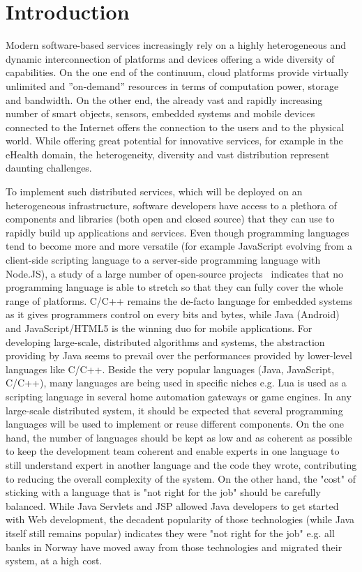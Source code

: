 \section{Introduction}

Modern software-based services increasingly rely on a highly heterogeneous and dynamic interconnection of platforms and devices offering a wide diversity of capabilities. On the one end of the continuum, cloud platforms provide virtually unlimited and ”on-demand” resources in terms of computation power, storage and bandwidth. On the other end, the already vast and rapidly increasing number of smart objects, sensors, embedded systems and mobile devices connected to the Internet offers the connection to the users and to the physical world. While offering great potential for innovative services, for example in the eHealth domain, the heterogeneity, diversity and vast distribution represent daunting challenges. 

To implement such distributed services, which will be deployed on an heterogeneous infrastructure, software developers have access to a plethora of components and libraries (both open and closed source) that they can use to rapidly build up applications and services. Even though programming languages tend to become more and more versatile (for example JavaScript evolving from a client-side scripting language to a server-side programming language with Node.JS), a study of a large number of open-source projects~\cite{DBLP:conf/icse/MorinFB15} indicates that no programming language is able to stretch so that they can fully cover the whole range of platforms. C/C++ remains the de-facto language for embedded systems as it gives programmers control on every bits and bytes, while Java (Android) and JavaScript/HTML5 is the winning duo for mobile applications. For developing large-scale, distributed algorithms and systems, the abstraction providing by Java seems to prevail over the performances provided by lower-level languages like C/C++. Beside the very popular languages (Java, JavaScript, C/C++), many languages are being used in specific niches e.g. Lua is used as a scripting language in several home automation gateways or game engines. 
In any large-scale distributed system, it should be expected that several programming languages will be used to implement or reuse different components. On the one hand, the number of languages should be kept as low and as coherent as possible to keep the development team coherent and enable experts in one language to still understand expert in another language and the code they wrote, contributing to reducing the overall complexity of the system. On the other hand, the "cost" of sticking with a language that is "not right for the job" should be carefully balanced. While Java Servlets and JSP allowed Java developers to get started with Web development, the decadent popularity of those technologies (while Java itself still remains popular) indicates they were "not right for the job" e.g. all banks in Norway have moved away from those technologies and migrated their system, at a high cost. 

